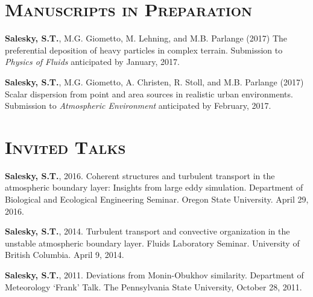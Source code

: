 \documentclass[11pt,letterpaper]{article}
\begin{document}



\section*{\textsc{Manuscripts in Preparation}} 

\textbf{Salesky, S.T.}, M.G. Giometto, M. Lehning, and M.B. Parlange (2017)
The preferential deposition of heavy particles in complex terrain. Submission 
to \textit{Physics of Fluids} anticipated by January, 2017.

\textbf{Salesky, S.T.}, M.G. Giometto, A. Christen, R. Stoll, and M.B. Parlange
(2017) Scalar dispersion from point and area sources in realistic urban
environments.  Submission to \textit{Atmospheric Environment} anticipated by
February, 2017.

\section*{\textsc{Invited Talks}} 

\textbf{Salesky, S.T.}, 2016. Coherent structures and turbulent transport in the atmospheric boundary layer: Insights 
from large eddy simulation. Department of Biological and Ecological Engineering Seminar. Oregon State University. 
April 29, 2016.

\textbf{Salesky, S.T.}, 2014. Turbulent transport and convective organization in the unstable atmospheric boundary layer. Fluids Laboratory Seminar. University of British Columbia. April 9, 2014. 

\textbf{Salesky, S.T.}, 2011. Deviations from Monin-Obukhov similarity. Department of Meteorology `Frank' Talk. The Pennsylvania State University, October 28, 2011. 
\end{document}
